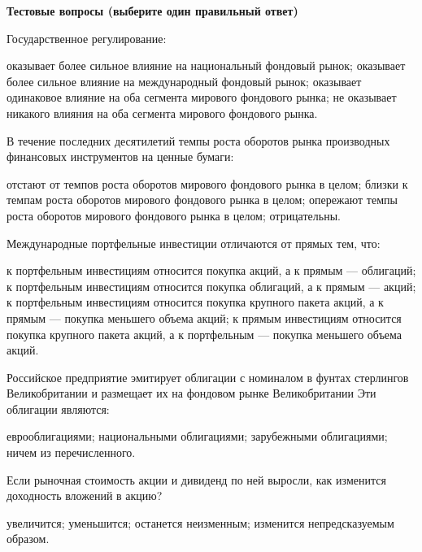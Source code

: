 \documentclass[12pt, table]{exam}
\begin{document}
\pagebreak
\noindent\textbf{Тестовые вопросы (выберите один правильный ответ)}

\begin{questions}
\begin{multicols}{2}
\setlength{\columnsep}{1cm}

\question  Государственное регулирование:
	 \begin{choices}
	 \choice оказывает более сильное влияние на национальный фондовый рынок;
	 \CC оказывает более сильное влияние на международный фондовый рынок;
	 \choice оказывает одинаковое влияние на оба сегмента мирового фондового рынка;
	 \choice не оказывает никакого влияния на оба сегмента мирового фондового рынка.
	 \end{choices}
\question  В течение последних десятилетий темпы роста оборотов рынка производных финансовых инструментов на ценные бумаги:
	 \begin{choices}
	 \CC отстают от темпов роста оборотов мирового фондового рынка в целом;
	 \choice близки к темпам роста оборотов мирового фондового рынка в целом;
	 \choice опережают темпы роста оборотов мирового фондового рынка в целом;
	 \choice отрицательны.
	 \end{choices}
\question  Международные портфельные инвестиции отличаются от прямых тем, что:
	 \begin{choices}
	 \CC к портфельным инвестициям относится покупка акций, а к прямым — облигаций;
	 \choice к портфельным инвестициям относится покупка облигаций, а к прямым — акций;
	 \choice к портфельным инвестициям относится покупка крупного пакета акций, а к прямым — покупка меньшего объема акций;
	 \choice к прямым инвестициям относится покупка крупного пакета акций, а к портфельным — покупка меньшего объема акций.
	 \end{choices}
\question  Российское предприятие эмитирует облигации с номиналом в фунтах стерлингов Великобритании и размещает их на фондовом рынке Великобритании Эти облигации являются:
	 \begin{choices}
	 \CC еврооблигациями;
	 \choice национальными облигациями;
	 \choice зарубежными облигациями;
	 \choice ничем из перечисленного.
	 \end{choices}
\question  Если рыночная стоимость акции и дивиденд по ней выросли, как изменится доходность вложений в акцию?
	 \begin{choices}
	 \choice увеличится;
	 \CC уменьшится;
	 \choice останется неизменным;
	 \choice изменится непредсказуемым образом.
	 \end{choices}

\end{multicols}
\end{questions}
\end{document}
